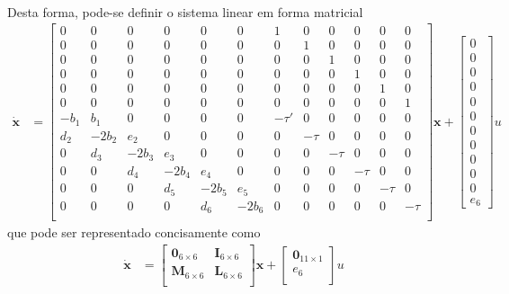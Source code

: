 \documentclass[a4paper,11pt]{scrartcl} %
\numberwithin{equation}{section} %
\numberwithin{figure}{section} %
\numberwithin{table}{section} %
\begin{document}
 \paragraph{} Desta forma, pode-se definir o sistema linear em forma matricial \begin{align}
 	\mathbf{\dot{x}} &= \left[\begin{array}{cccccccccccc}
 		0 & 0 & 0 & 0 & 0 & 0 & 1 & 0 & 0 & 0 & 0 & 0\\
 		0 & 0 & 0 & 0 & 0 & 0 & 0 & 1 & 0 & 0 & 0 & 0\\
 		0 & 0 & 0 & 0 & 0 & 0 & 0 & 0 & 1 & 0 & 0 & 0\\
 		0 & 0 & 0 & 0 & 0 & 0 & 0 & 0 & 0 & 1 & 0 & 0\\
 		0 & 0 & 0 & 0 & 0 & 0 & 0 & 0 & 0 & 0 & 1 & 0\\
 		0 & 0 & 0 & 0 & 0 & 0 & 0 & 0 & 0 & 0 & 0 & 1\\
 		-b_1 & b_1 & 0 & 0 & 0 & 0 & -\tau' & 0     & 0 & 0 & 0 & 0\\
 		d_2 & -2b_2  & e_2  & 0  & 0 & 0 &  0    & -\tau & 0 & 0 & 0 & 0\\
 		0 & d_3 & -2b_3  & e_3  & 0  & 0 & 0 &  0    & -\tau & 0 & 0 & 0\\
 		0 & 0 & d_4 & -2b_4  & e_4  & 0  & 0 & 0 &  0    & -\tau & 0 & 0\\
 		0 & 0 & 0 & d_5 & -2b_5  & e_5  & 0  & 0 & 0 &  0    & -\tau & 0\\
 		0 & 0 & 0 & 0 & d_6 & -2b_6  & 0  & 0 & 0 &  0    & 0   &-\tau\\
 	\end{array}\right]\mathbf{x} + \left[\begin{array}{c}
	0\\	0\\	0\\	0\\	0\\ 0\\ 0\\ 0\\ 0\\ 0\\ 0\\ e_6
\end{array}
\right]u
 \end{align} que pode ser representado concisamente como \begin{align}
 	\mathbf{\dot{x}} &= \left[\begin{array}{cc}
	\mathbf{0}_{6\times 6} & \mathbf{I}_{6\times 6}\\
	\mathbf{M}_{6\times 6} & \mathbf{L}_{6\times 6}\\
\end{array}\right] \mathbf{x} + \left[\begin{array}{c}
	\mathbf{0}_{11\times 1}\\ e_6\\
\end{array} \right]u
 \end{align}
\end{document}
